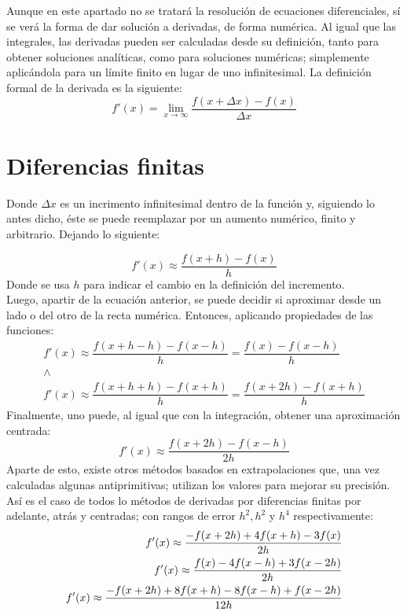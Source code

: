 \documentclass[12pt,oneside,FLEQN]{report}
\begin{document}
{Aunque en este apartado no se tratará la resolución de ecuaciones diferenciales, sí se verá la forma de dar solución a derivadas, de forma numérica. Al igual que las integrales, las derivadas pueden ser calculadas desde su definición, tanto para obtener soluciones analíticas, como para soluciones numéricas; simplemente aplicándola para un límite finito en lugar de uno infinitesimal. La definición formal de la derivada es la siguiente:
\begin{equation}
	f'(x)=\lim_{x\to\infty}\dfrac{f(x+\Delta x)-f(x)}{\Delta x}
\end{equation}
\section{Diferencias finitas}
Donde $\Delta x$ es un incrimento infinitesimal dentro de la función y, siguiendo lo antes dicho, éste se puede reemplazar por un aumento numérico, finito y arbitrario. Dejando lo siguiente:

\begin{equation}
	f'(x)\approx\dfrac{f(x+h)-f(x)}{h}
\end{equation}
Donde se usa $h$ para indicar el cambio en la definición del incremento.\\

Luego, apartir de la ecuación anterior, se puede decidir si aproximar desde un lado o del otro de la recta numérica. Entonces, aplicando propiedades de las funciones:
\begin{align}
	f'(x)\approx\dfrac{f(x+h-h)-f(x-h)}{h}=\dfrac{f(x)-f(x-h)}{h}\\
	\land\\
	f'(x)\approx\dfrac{f(x+h+h)-f(x+h)}{h}=\dfrac{f(x+2h)-f(x+h)}{h}
\end{align}
Finalmente, uno puede, al igual que con la integración, obtener una aproximación centrada:
\begin{equation}
	f'(x)\approx\dfrac{f(x+2h)-f(x-h)}{2h}
\end{equation}
Aparte de esto, existe otros métodos basados en extrapolaciones que, una vez calculadas algunas antiprimitivas; utilizan los valores para mejorar su precisión. Así es el caso de todos lo métodos de derivadas por diferencias finitas por adelante, atrás y centradas; con rangos de error $h^{2},h^{2}$ y $h^{4}$ respectivamente:
\begin{align}
	f'(x)\approx\dfrac{-f(x+2h)+4f(x+h)-3f(x)}{2h}\hfill\\
	f'(x)\approx\dfrac{f(x)-4f(x-h)+3f(x-2h)}{2h}\hfill\\
	f'(x)\approx\dfrac{-f(x+2h)+8f(x+h)-8f(x-h)+f(x-2h)}{12h}\hfill
\end{align}
}
\end{document}

